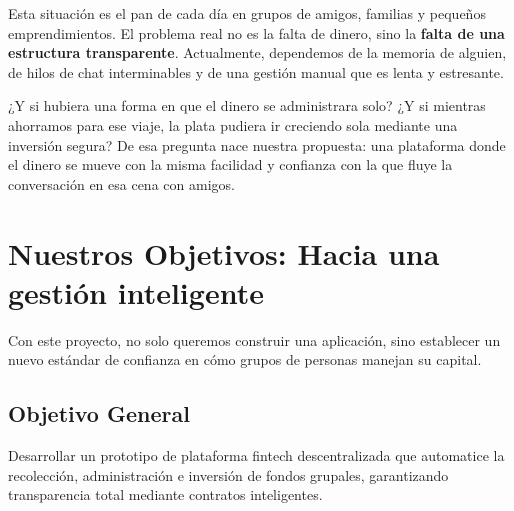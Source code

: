 \documentclass[12pt,a4paper]{article}
\begin{document}
Esta situación es el pan de cada día en grupos de amigos, familias y pequeños emprendimientos. El problema real no es la falta de dinero, sino la \textbf{falta de una estructura transparente}. Actualmente, dependemos de la memoria de alguien, de hilos de chat interminables y de una gestión manual que es lenta y estresante. 

¿Y si hubiera una forma en que el dinero se administrara solo? ¿Y si mientras ahorramos para ese viaje, la plata pudiera ir creciendo sola mediante una inversión segura? De esa pregunta nace nuestra propuesta: una plataforma donde el dinero se mueve con la misma facilidad y confianza con la que fluye la conversación en esa cena con amigos.

\section*{Nuestros Objetivos: Hacia una gestión inteligente}

Con este proyecto, no solo queremos construir una aplicación, sino establecer un nuevo estándar de confianza en cómo grupos de personas manejan su capital.

\subsection*{Objetivo General}
Desarrollar un prototipo de plataforma fintech descentralizada que automatice la recolección, administración e inversión de fondos grupales, garantizando transparencia total mediante contratos inteligentes.
\end{document}
